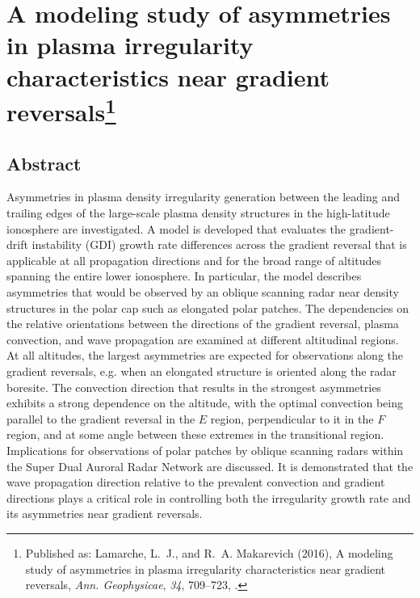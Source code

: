 
\chapter[A modeling study of asymmetries in plasma irregularity characteristics near gradient reversals]{A modeling study of asymmetries in plasma irregularity characteristics near gradient reversals\footnote{Published as: {Lamarche}, L.~J., and R.~A. {Makarevich} (2016), A modeling study of asymmetries in plasma irregularity characteristics near gradient reversals, \textit{Ann. Geophysicae}, \textit{34}, 709--723, .}}

\label{sec:paper2}




\section*{Abstract}
Asymmetries in plasma density irregularity generation between the leading and trailing edges of the large-scale plasma density structures in the high-latitude ionosphere are investigated. A model is developed that evaluates the gradient-drift instability (GDI) growth rate differences across the gradient reversal that is applicable at all propagation directions and for the broad range of altitudes spanning the entire lower ionosphere. In particular, the model describes asymmetries that would be observed by an oblique scanning radar near density structures in the polar cap such as elongated polar patches. The dependencies on the relative orientations between the directions of the gradient reversal, plasma convection, and wave propagation are examined at different altitudinal regions. At all altitudes, the largest asymmetries are expected for observations along the gradient reversals, e.g. when an elongated structure is oriented along the radar boresite. The convection direction that results in the strongest asymmetries exhibits a strong dependence on the altitude, with the optimal convection being parallel to the gradient reversal in the \(E\) region, perpendicular to it in the \(F\) region, and at some angle between these extremes in the transitional region. Implications for observations of polar patches by oblique scanning radars within the Super Dual Auroral Radar Network are discussed. It is demonstrated that the wave propagation direction relative to the prevalent convection and gradient directions plays a critical role in controlling both the irregularity growth rate and its asymmetries near gradient reversals.



